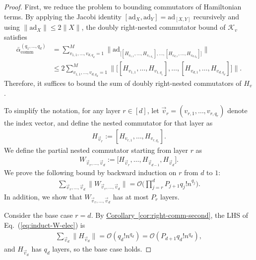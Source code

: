 \documentclass[11pt]{article}
\newcommand{\eq}[1]{(\ref{eq:#1})}
\newcommand{\cor}[1]{\hyperref[cor:#1]{Corollary~\ref*{cor:#1}}}
\newcommand{\ad}{\mathrm{ad}}
\renewcommand{\comm}{\mathrm{comm}}
\newcommand{\mc}{\mathcal}
\begin{document}
\begin{proof}
    First, we reduce the problem to bounding commutators of Hamiltonian terms. By applying the Jacobi identity $[\ad_{X}, \ad_Y] = \ad_{[X,Y]}$ recursively and using $\|\ad_X\| \le 2\|X\|$, the doubly right-nested commutator bound of $\mc K_v$ satisfies
    \begin{align*}
    \bar{\alpha}_{\comm}^{(q_1, \ldots, q_{d})}
    &= \sum_{v_{1,1}, \ldots, v_{d, q_{d}} = 1}^M \bigg\| \ad_{\Big[ 
         [H_{v_{1,1}}, \ldots, H_{v_{1,q_1}}], \ldots, 
        [H_{v_{d,1}}, \ldots, H_{v_{d,q_{d}}}]
     \Big]} \bigg\|\\
     &\le 2\sum_{v_{1,1}, \ldots, v_{d, q_{d}} = 1}^M \bigg\|{\Big[ 
         [H_{v_{1,1}}, \ldots, H_{v_{1,q_1}}], \ldots, 
        [H_{v_{d,1}}, \ldots, H_{v_{d,q_{d}}}]
     \Big]} \bigg\|.
    \end{align*}
    Therefore, it suffices to bound the sum of doubly right-nested commutators of $H_v$. 
    
    To simplify the notation, for any layer $r \in [d]$, let $\vec{v}_r = (v_{r,1}, \ldots, v_{r, q_r})$ denote the index vector, and define the nested commutator for that layer as
    \begin{align*}
        H_{\vec{v}_r} := [H_{v_{r,1}}, \ldots, H_{v_{r, q_r}}].
    \end{align*}
    We define the partial nested commutator starting from layer $r$ as
    \begin{align*}
        W_{\vec{v}_{r}, \ldots, \vec{v}_d} := \Big[ H_{\vec{v}_r}, \ldots, H_{\vec{v}_{d-1}}, H_{\vec{v}_d} \Big].
    \end{align*}
    We prove the following bound by backward induction on $r$ from $d$ to $1$:
    \begin{align} \label{eq:induct-W-elec}
        \sum_{\vec{v}_{r}, \ldots, \vec{v}_{d}} \Big\|W_{\vec{v}_{r}, \ldots, \vec{v}_d}\Big\| = \mathcal{O}\bigg(\prod_{j=r}^{d}P_{j+1} q_j! n^{q_j}\bigg).
    \end{align} In addition, we show that $W_{\vec{v}_{r}, \ldots, \vec{v}_d}$ has at most $P_r$ layers.  
    
    Consider the base case $r=d$. By \cor{right-comm-second}, the LHS of Eq.~\eq{induct-W-elec} is \begin{align*}
        \sum_{\vec{v}_d} \|H_{\vec{v}_d}\| = \mc{O}(q_d ! n^{q_d}) = \mc{O}(P_{d+1}q_d ! n^{q_d}),
    \end{align*} and $H_{\vec{v}_d}$ has $q_d$ layers, so the base case holds. 


\end{proof}
\end{document}

